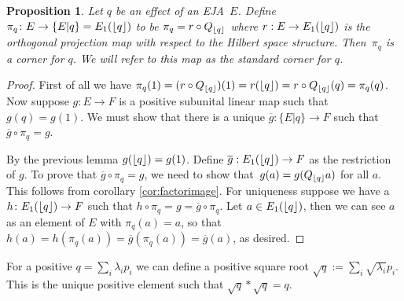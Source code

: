 \documentclass[submission,copyright,creativecommons]{eptcs}
\newcounter{main}
\newtheorem{proposition}[main]{Proposition}
\theoremstyle{definition}
\DeclarePairedDelimiter{\floor}{\lfloor}{\rfloor}
\newcommand{\cl}[1]{\overline{#1}}
\begin{document}
\begin{proposition}\label{eja:quot}
	Let $q$ be an effect of an EJA~$E$. Define $\pi_q\colon E\rightarrow \{E\lvert
	q\} = E_1(\floor{q})$ to be $\pi_q = r\circ Q_{\floor{q}}$
	where $r: E\rightarrow E_1(\floor{q})$ is the orthogonal
	projection map with respect to the Hilbert space structure.
    Then~$\pi_q$ is a corner for $q$. We will refer to this map
	as the \emph{standard corner} for $q$.
\end{proposition}
\begin{proof}
	First of all we have $\pi_q(1) = (r \circ Q_{\floor{q}})(1) = r (\floor{q}) = r \circ Q_{\floor{q}}(q) = \pi_q(q)$. Now suppose $g\colon E\rightarrow F$ is a positive subunital linear map such that $g(q)=g(1)$. We must show that there is a unique $\cl{g}:\{E\lvert q\} \rightarrow F$ such that $\cl{g}\circ \pi_q= g$.

	By the previous lemma $g(\floor{q})=g(1)$. Define
	$\cl{g}:E_1(\floor{q})\rightarrow F$ as the restriction of
	$g$. To prove that $\cl{g}\circ \pi_q= g$, we need
	to show that~$g(a)=g(Q_{\floor{q}}a)$ for all $a$.
    This follows from corollary \ref{cor:factorimage}.
	For uniqueness suppose we have a $h\colon E_1(\floor{q})\rightarrow
	F$ such that $h\circ \pi_q = g = \cl{g}\circ \pi_q$. Let
	$a\in E_1(\floor{q})$, then we can see $a$ as an element
	of $E$ with $\pi_q(a)=a$, so that $h(a) = h(\pi_q(a)) =
	\cl{g}(\pi_q(a)) = \cl{g}(a)$, as desired.
\end{proof}

For a positive $q=\sum_i \lambda_i p_i$ we can define a positive
square root $\sqrt{q}:=\sum_i \sqrt{\lambda_i}p_i$. This is the
unique positive element such that $\sqrt{q}*\sqrt{q}=q$.
\end{document}
